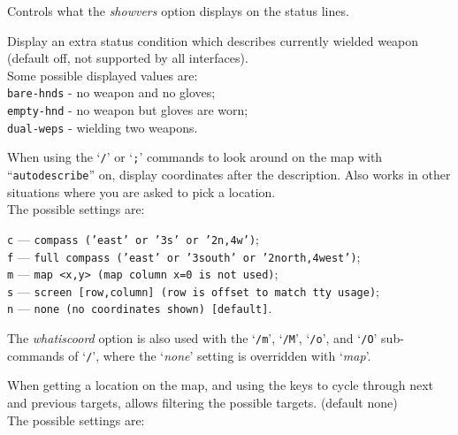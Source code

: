 \documentclass[titlepage]{article}
\begin{document}
\begin{description}[font=\mdseries\itshape]
Controls what the \textit{showvers} option displays on the status lines.
\item[weaponstatus]
Display an extra status condition which describes currently wielded weapon
(default off, not supported by all interfaces).
\\
Some possible displayed values are:
\\
\texttt{bare-hnds} - no weapon and no gloves;\\
\texttt{empty-hnd} - no weapon but gloves are worn;\\
\texttt{dual-weps} - wielding two weapons.
\item[whatis\textunderscore coord]
When using the `\texttt{/}' or `\texttt{;}' commands to look around on the map with
``\texttt{autodescribe}''
on, display coordinates after the description.
Also works in other situations where you are asked to pick a location.\\

The possible settings are:

\texttt{c} --- \texttt{compass ('east' or '3s' or '2n,4w')};\\
\texttt{f} --- \texttt{full compass ('east' or '3south' or '2north,4west')};\\
\texttt{m} --- \texttt{map <x,y> (map column x=0 is not used)};\\
\texttt{s} --- \texttt{screen [row,column] (row is offset to match tty usage)};\\
\texttt{n} --- \texttt{none (no coordinates shown) [default]}.

The
\textit{whatis\textunderscore coord}
option is also used with
the `\texttt{/m}', `\texttt{/M}', `\texttt{/o}', and `\texttt{/O}' sub-commands
of `\texttt{/}',
where the `\textit{none}' setting is overridden with `\textit{map}'.
\item[whatis\textunderscore filter]
When getting a location on the map, and using the keys to cycle through
next and previous targets, allows filtering the possible targets.
(default none)\\
The possible settings are:


\end{description}
\end{document}
